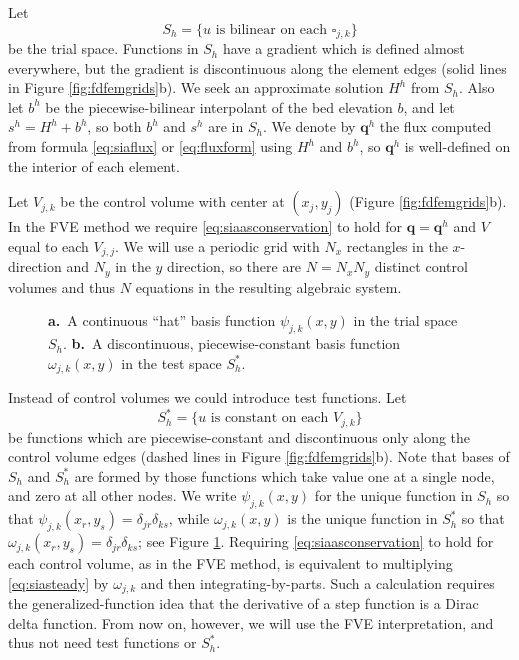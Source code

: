 \documentclass[twocolumn,letterpaper]{igs}
\newcommand\bq{\mathbf{q}}
\begin{document}
Let
\begin{equation}
S_h = \{u \text{ is bilinear on each $\square_{j,k}$}\}
\end{equation}
be the trial space.  Functions in $S_h$ have a gradient which is defined almost everywhere, but the gradient is discontinuous along the element edges (solid lines in Figure \ref{fig:fdfemgrids}b).  We seek an approximate solution $H^h$ from $S_h$.  Also let $b^h$ be the piecewise-bilinear interpolant of the bed elevation $b$, and let $s^h=H^h+b^h$, so both $b^h$ and $s^h$ are in $S_h$.  We denote by $\bq^h$ the flux computed from formula \eqref{eq:siaflux} or \eqref{eq:fluxform} using $H^h$ and $b^h$, so $\bq^h$ is well-defined on the interior of each element.

Let $V_{j,k}$ be the control volume with center at $(x_j,y_j)$ (Figure \ref{fig:fdfemgrids}b).  In the FVE method we require \eqref{eq:siaasconservation} to hold for $\bq=\bq^h$ and $V$ equal to each $V_{j,j}$.  We will use a periodic grid with $N_x$ rectangles in the $x$-direction and $N_y$ in the $y$ direction, so there are $N=N_xN_y$ distinct control volumes  and thus $N$ equations in the resulting algebraic system.

\begin{figure}[ht]
\begin{center}
 \quad 
\end{center}
\caption{\textbf{a.}~A continuous ``hat'' basis function $\psi_{j,k}(x,y)$ in the trial space $S_h$.  \textbf{b.}~A discontinuous, piecewise-constant basis function $\omega_{j,k}(x,y)$ in the test space $S_h^*$.}
\label{fig:fembases}
\end{figure}

Instead of control volumes we could introduce test functions.  Let
\begin{equation}
S_h^* = \{u \text{ is constant on each $V_{j,k}$}\}
\end{equation}
be functions which are piecewise-constant and discontinuous only along the control volume edges (dashed lines in Figure \ref{fig:fdfemgrids}b).  Note that bases of $S_h$ and $S_h^*$ are formed by those functions which take value one at a single node, and zero at all other nodes.  We write $\psi_{j,k}(x,y)$ for the unique function in $S_h$ so that $\psi_{j,k}(x_r,y_s) = \delta_{jr} \delta_{ks}$, while $\omega_{j,k}(x,y)$ is the unique function in $S_h^*$ so that $\omega_{j,k}(x_r,y_s) = \delta_{jr} \delta_{ks}$; see Figure \ref{fig:fembases}.  Requiring \eqref{eq:siaasconservation} to hold for each control volume, as in the FVE method, is equivalent to multiplying \eqref{eq:siasteady} by $\omega_{j,k}$ and then integrating-by-parts.  Such a calculation requires the generalized-function idea that the derivative of a step function is a Dirac delta function.  From now on, however, we will use the FVE interpretation, and thus not need test functions or $S_h^*$.
\end{document}
